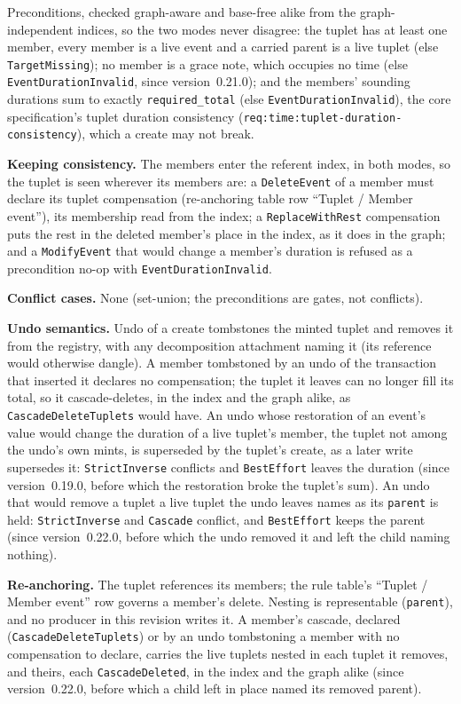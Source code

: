 \documentclass[11pt,letterpaper]{report}
\begin{document}
Preconditions, checked graph-aware and base-free alike from the
graph-independent indices, so the two modes never disagree: the tuplet has at
least one member, every member is a live event and a carried parent is a live
tuplet (else \texttt{TargetMissing}); no member is a grace note, which
occupies no time (else \texttt{EventDurationInvalid}, since version~0.21.0);
and the members' sounding durations sum
to exactly \texttt{required\_total} (else \texttt{EventDurationInvalid}), the
core specification's tuplet duration consistency
(\texttt{req:time:tuplet-duration-consistency}), which a create
may not break.

\textbf{Keeping consistency.} The members enter the referent index, in both
modes, so the tuplet is seen wherever its members are: a \texttt{DeleteEvent}
of a member must declare its tuplet compensation (re-anchoring table row
``Tuplet / Member event''), its membership read from the index; a
\texttt{ReplaceWithRest} compensation puts the rest in the deleted member's
place in the index, as it does in the graph; and a \texttt{ModifyEvent} that
would change a member's duration is refused as a precondition no-op with
\texttt{EventDurationInvalid}.

\textbf{Conflict cases.} None (set-union; the preconditions are gates, not
conflicts).

\textbf{Undo semantics.} Undo of a create tombstones the minted tuplet and
removes it from the registry, with any decomposition attachment naming it
(its reference would otherwise dangle). A member tombstoned by an undo of the
transaction that inserted it declares no compensation; the tuplet it leaves
can no longer fill its total, so it cascade-deletes, in the index and the
graph alike, as \texttt{CascadeDeleteTuplets} would have. An undo whose
restoration of an event's value would change the duration of a live tuplet's
member, the tuplet not among the undo's own mints, is superseded by the
tuplet's create, as a later write supersedes it: \texttt{StrictInverse}
conflicts and \texttt{BestEffort} leaves the duration (since
version~0.19.0, before which the restoration broke the tuplet's sum). An
undo that would remove a tuplet a live tuplet the undo leaves names as its
\texttt{parent} is held: \texttt{StrictInverse} and \texttt{Cascade}
conflict, and \texttt{BestEffort} keeps the parent (since version~0.22.0,
before which the undo removed it and left the child naming nothing).

\textbf{Re-anchoring.} The tuplet references its members; the rule table's
``Tuplet / Member event'' row governs a member's delete. Nesting is
representable (\texttt{parent}), and no producer in this revision writes it.
A member's cascade, declared (\texttt{CascadeDeleteTuplets}) or by an undo
tombstoning a member with no compensation to declare, carries the live
tuplets nested in each tuplet it removes, and theirs, each
\texttt{CascadeDeleted}, in the index and the graph alike (since
version~0.22.0, before which a child left in place named its removed
parent).
\end{document}
